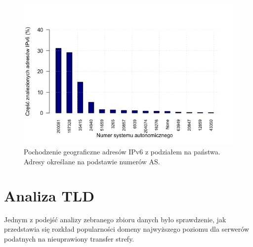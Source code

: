 \begin{figure}[ht]
	\centering
	\includegraphics[width=1.0\textwidth]{image/ipv6_countries_no_title}
	\caption{Pochodzenie geograficzne adresów IPv6 z podziałem na państwa. Adresy określane na podstawie numerów AS.}
	\label{fig:ipv6_countries}
\end{figure}

\section{Analiza TLD}
Jednym z podejść analizy zebranego zbioru danych było sprawdzenie, jak przedstawia się rozkład popularności domeny najwyższego poziomu
dla serwerów podatnych na nieuprawiony transfer strefy.


